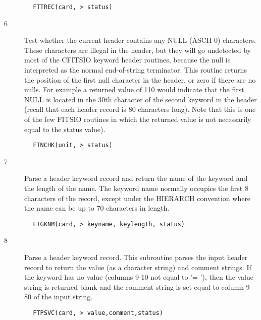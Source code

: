 \documentclass[11pt]{book}
\begin{document}
\begin{verbatim}
        FTTREC(card, > status)
\end{verbatim}

\begin{description}
\item[6 ] Test whether the current header contains any NULL (ASCII 0) characters.
    These characters are illegal in the header, but they will go undetected
    by most of the CFITSIO keyword header routines, because the null is
    interpreted as the normal end-of-string terminator.  This routine returns
    the position of the first null character in the header, or zero if there
    are no nulls.  For example a returned value of 110 would indicate that
    the first NULL is located in the 30th character of the second keyword
    in the header (recall that each header record is 80 characters long).
    Note that this is one of the few FITSIO routines in which the returned
   value is not necessarily equal to the status value).
\end{description}

\begin{verbatim}
        FTNCHK(unit, > status)
\end{verbatim}

\begin{description}
\item[7 ] Parse a header keyword record and return the name of the keyword
    and the length of the name.
    The keyword name normally occupies the first 8 characters of the
    record, except under the HIERARCH convention where the name can
   be up to 70 characters in length.
\end{description}

\begin{verbatim}
        FTGKNM(card, > keyname, keylength, status)
\end{verbatim}

\begin{description}
\item[8 ] Parse a header keyword record.
    This subroutine parses the input header record to return the value (as
    a character string) and comment strings.  If the keyword has no
    value (columns 9-10 not equal to '= '), then the value string is returned
    blank and the comment string is set equal to column 9 - 80 of the
   input string.
\end{description}

\begin{verbatim}
        FTPSVC(card, > value,comment,status)
\end{verbatim}
\end{document}
